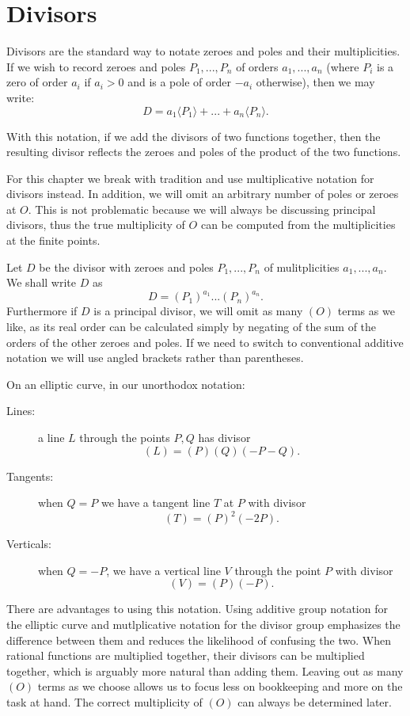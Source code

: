 \section {Divisors}

Divisors are the standard way
to notate zeroes and poles and their multiplicities.
If we wish to record zeroes and poles $P_1,...,P_n$
of orders $a_1,...,a_n$ (where $P_i$ is a zero of order
$a_i$ if $a_i > 0$ and is a pole of order $-a_i$ otherwise), then
we may write:
\[ D = a_1\langle P_1\rangle + ... + a_n \langle P_n\rangle .\]

With this notation, if we add the divisors of two functions together,
then the resulting divisor reflects the zeroes and poles of the product
of the two functions.

For this chapter we break with tradition and use multiplicative
notation for divisors instead. In addition, we will omit an arbitrary
number of poles or zeroes at $O$. This is not problematic because we
will always be discussing principal divisors, thus the true multiplicity
of $O$ can be computed from the multiplicities at the finite points.

Let $D$ be the divisor with zeroes and poles $P_1,...,P_n$
of mulitplicities $a_1,...,a_n$.
We shall write $D$ as
\[ D = (P_1)^{a_1} ... (P_n)^{a_n} . \]
Furthermore if $D$ is a principal divisor, we will
omit as many $(O)$ terms as we like, as its real order
can be calculated simply by negating
of the sum of the orders of the other zeroes and poles.
If we need to switch to conventional additive
notation we will use angled brackets
rather than parentheses.

On an elliptic curve, in our unorthodox notation:
\begin{description}
\item[Lines:]
a line $L$ through the points $P, Q$ has divisor
\[ (L) = (P)(Q)(-P-Q) . \]
\item[Tangents:]
when $Q = P$ we have a tangent line $T$ at $P$ with divisor
\[ (T) = (P)^2 (-2P) . \]
\item[Verticals:]
when $Q = -P$, we have a vertical line $V$ through the point $P$
with divisor
\[ (V) = (P)(-P) . \]
\end{description}

There are advantages to using this notation. Using additive group
notation for the elliptic curve and mutlplicative notation for the divisor
group emphasizes the difference between them and reduces the likelihood of
confusing the two. When rational functions are multiplied together,
their divisors can be multiplied together, which is arguably
more natural than adding them.
Leaving out as many $(O)$ terms as we choose allows us to focus less on
bookkeeping and more on the task at hand.
The correct multiplicity of $(O)$ can always be determined later.

